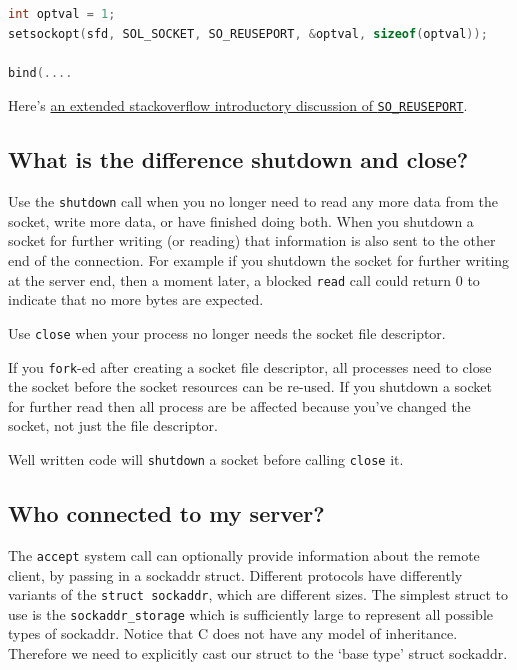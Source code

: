 \begin{lstlisting}[language=C]
int optval = 1;
setsockopt(sfd, SOL_SOCKET, SO_REUSEPORT, &optval, sizeof(optval));

bind(....
\end{lstlisting}

Here's \href{http://stackoverflow.com/questions/14388706/socket-options-so-reuseaddr-and-so-reuseport-how-do-they-differ-do-they-mean-t}{an extended stackoverflow introductory discussion of \texttt{SO\_REUSEPORT}}.

\subsection{What is the difference shutdown and close?}\label{what-is-the-difference-shutdown-and-close}

Use the \texttt{shutdown} call when you no longer need to read any more data from the socket, write more data, or have finished doing both. When you shutdown a socket for further writing (or reading) that information is also sent to the other end of the connection. For example if you shutdown the socket for further writing at the server end, then a moment later, a blocked \texttt{read} call could return 0 to indicate that no more bytes are expected.

Use \texttt{close} when your process no longer needs the socket file descriptor.

If you \texttt{fork}-ed after creating a socket file descriptor, all processes need to close the socket before the socket resources can be re-used. If you shutdown a socket for further read then all process are be affected because you've changed the socket, not just the file descriptor.

Well written code will \texttt{shutdown} a socket before calling \texttt{close} it.

\subsection{Who connected to my server?}\label{who-connected-to-my-server}

The \texttt{accept} system call can optionally provide information about the remote client, by passing in a sockaddr struct. Different protocols have differently variants of the \texttt{struct sockaddr}, which are different sizes. The simplest struct to use is the \texttt{sockaddr\_storage} which is sufficiently large to represent all possible types of sockaddr. Notice that C does not have any model of inheritance. Therefore we need to explicitly cast our struct to the `base type' struct sockaddr.

